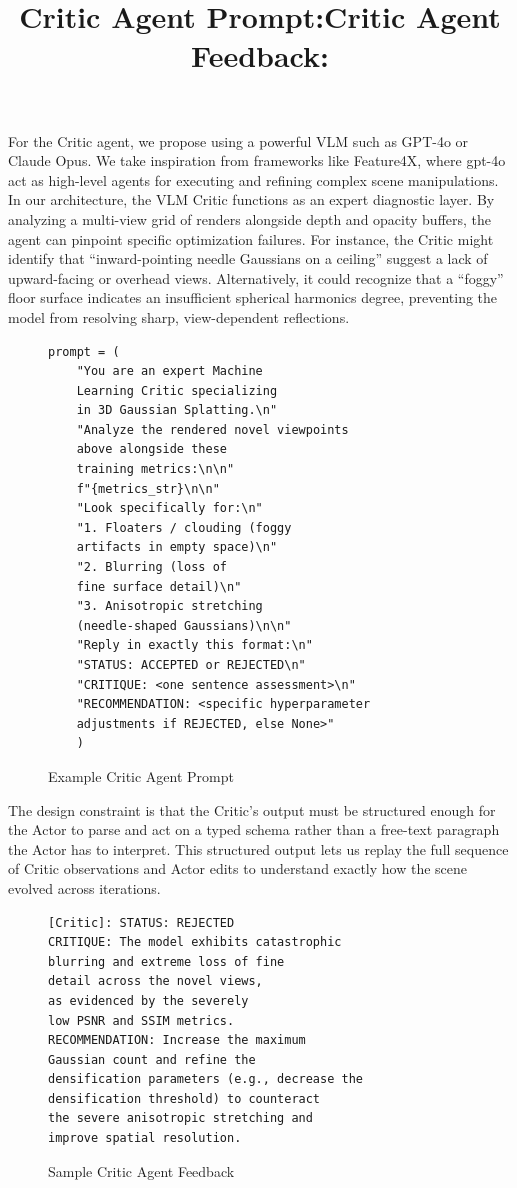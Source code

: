 \noindent For the Critic agent, we propose using a powerful VLM such as GPT-4o or Claude Opus. We take inspiration from frameworks like Feature4X, where gpt-4o act as high-level agents for executing and refining complex scene manipulations. In our architecture, the VLM Critic functions as an expert diagnostic layer. By analyzing a multi-view grid of renders alongside depth and opacity buffers, the agent can pinpoint specific optimization failures. For instance, the Critic might identify that “inward-pointing needle Gaussians on a ceiling” suggest a lack of upward-facing or overhead views. Alternatively, it could recognize that a “foggy” floor surface indicates an insufficient spherical harmonics degree, preventing the model from resolving sharp, view-dependent reflections.\\

\newpage
\noindent\title{Critic Agent Prompt:}
\begin{figure}[h]
\centering
\begin{verbatim}
prompt = (
    "You are an expert Machine 
    Learning Critic specializing 
    in 3D Gaussian Splatting.\n"
    "Analyze the rendered novel viewpoints 
    above alongside these 
    training metrics:\n\n"
    f"{metrics_str}\n\n"
    "Look specifically for:\n"
    "1. Floaters / clouding (foggy 
    artifacts in empty space)\n"
    "2. Blurring (loss of 
    fine surface detail)\n"
    "3. Anisotropic stretching 
    (needle-shaped Gaussians)\n\n"
    "Reply in exactly this format:\n"
    "STATUS: ACCEPTED or REJECTED\n"
    "CRITIQUE: <one sentence assessment>\n"
    "RECOMMENDATION: <specific hyperparameter 
    adjustments if REJECTED, else None>"
    )
\end{verbatim}
\caption{Example Critic Agent Prompt}
\label{fig:critic-agent-prompt}
\end{figure}


\noindent The design constraint is that the Critic's output must be structured enough for the Actor to parse and act on a typed schema rather than a free-text paragraph the Actor has to interpret. This structured output lets us replay the full sequence of Critic observations and Actor edits to understand exactly how the scene evolved across iterations.\\

\noindent\title{Critic Agent Feedback:}
\begin{figure}[h]
\centering
\begin{verbatim}
[Critic]: STATUS: REJECTED
CRITIQUE: The model exhibits catastrophic 
blurring and extreme loss of fine 
detail across the novel views, 
as evidenced by the severely 
low PSNR and SSIM metrics.
RECOMMENDATION: Increase the maximum 
Gaussian count and refine the 
densification parameters (e.g., decrease the 
densification threshold) to counteract 
the severe anisotropic stretching and 
improve spatial resolution.
\end{verbatim}
\caption{Sample Critic Agent Feedback}
\label{fig:critic-agent-prompt}
\end{figure}